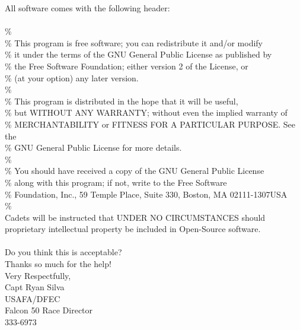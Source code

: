 \documentclass{article}
\begin{document}
\newpage
\noindent All software comes with the following header: \\
 \\
\% \\
\%    This program is free software; you can redistribute it and/or modify \\
\%    it under the terms of the GNU General Public License as published by \\
\%    the Free Software Foundation; either version 2 of the License, or \\
\%    (at your option) any later version. \\
\% \\
\%    This program is distributed in the hope that it will be useful, \\
\%    but WITHOUT ANY WARRANTY; without even the implied warranty of \\
\%    MERCHANTABILITY or FITNESS FOR A PARTICULAR PURPOSE.  See the \\
\%    GNU General Public License for more details. \\
\% \\
\%    You should have received a copy of the GNU General Public License \\
\%    along with this program; if not, write to the Free Software \\
\%    Foundation, Inc., 59 Temple Place, Suite 330, Boston, MA  02111-1307USA \\
\%  \\

\noindent Cadets will be instructed that UNDER NO CIRCUMSTANCES should proprietary intellectual property be included in Open-Source software. \\
\hspace{0pt} \\
\noindent Do you think this is acceptable? \\

\noindent Thanks so much for the help! \\

\noindent Very Respectfully, \\
Capt Ryan Silva \\
USAFA/DFEC \\
Falcon 50 Race Director \\
333-6973 \\
\end{document}
